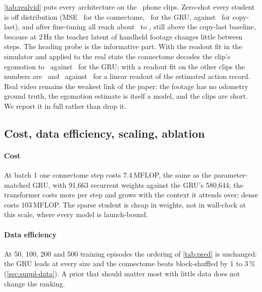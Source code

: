 \cref{tab:realvid} puts every architecture on the \nRvClips\ phone clips. Zero-shot every student is off distribution
(MSE \nConnRvMse\ for the connectome, \nGruRvMse\ for the GRU, against \nCopyLastRvMse\ for copy-last), and after
fine-tuning all reach about \nConnRvFtMse\ to \nGruRvFtMse, still above the copy-last baseline, because at 2\,Hz the
teacher latent of handheld footage changes little between steps. The heading probe is the informative part. With the
readout fit in the simulator and applied to the real state the connectome decodes the clip's egomotion to
\nConnRvTransferHd\degree\ against \nGruRvTransferHd\degree\ for the GRU; with a readout fit on the other clips the
numbers are \nConnRvIndomainHd\ and \nGruRvIndomainHd\degree\ against \nActOnlyRvHd\degree\ for a linear readout of the
estimated action record.  Real video remains the weakest link of the paper: the footage has no odometry ground truth, the
egomotion estimate is itself a model, and the clips are short. We report it in full rather than drop it.

\subsection{Cost, data efficiency, scaling, ablation}
\label{sec:more}

\paragraph{Cost} At batch 1 one connectome step costs 7.4\,MFLOP, the same as the parameter-matched GRU, with 91,663
recurrent weights against the GRU's 580,644; the transformer costs more per step and grows with the context it
attends over; dense costs 103\,MFLOP. The sparse student is cheap in weights, not in wall-clock at this scale, where
every model is launch-bound.

\paragraph{Data efficiency} At 50, 100, 200 and 500 training episodes the ordering of \cref{tab:pred} is unchanged:
the GRU leads at every size and the connectome beats block-shuffled by 1 to 3\,\% (\cref{sec:suppl-data}). A prior
that should matter most with little data does not change the ranking.

